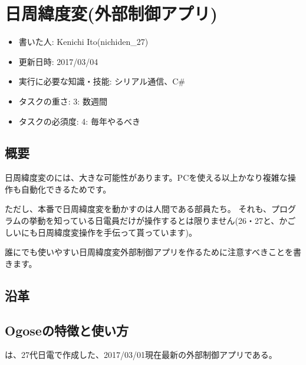\documentclass[letterpaper,10pt,dvipdfmx]{sphinxmanual}
\begin{document}
\chapter{日周緯度変(外部制御アプリ)}
\label{\detokenize{nissyu-idohen/pc-software:}}\label{\detokenize{nissyu-idohen/pc-software::doc}}\label{\detokenize{nissyu-idohen/pc-software:id1}}\begin{itemize}
\item {} 
書いた人: Kenichi Ito(nichiden\_27)

\item {} 
更新日時: 2017/03/04

\item {} 
実行に必要な知識・技能: シリアル通信、C\#

\item {} 
タスクの重さ: 3: 数週間

\item {} 
タスクの必須度: 4: 毎年やるべき

\end{itemize}


\section{概要}
\label{\detokenize{nissyu-idohen/pc-software:}}\label{\detokenize{nissyu-idohen/pc-software:id2}}
日周緯度変の{\hyperref[\detokenize{nissyu-idohen/ikebukuro::doc}]{}}には、大きな可能性があります。PCを使える以上かなり複雑な操作も自動化できるためです。

ただし、本番で日周緯度変を動かすのは人間である部員たち。
それも、プログラムの挙動を知っている日電員だけが操作するとは限りません(26・27と、かごしいにも日周緯度変操作を手伝って貰っています)。

誰にでも使いやすい日周緯度変外部制御アプリを作るために注意すべきことを書きます。


\section{沿革}
\label{\detokenize{nissyu-idohen/pc-software:}}\label{\detokenize{nissyu-idohen/pc-software:id3}}


\section{Ogoseの特徴と使い方}
\label{\detokenize{nissyu-idohen/pc-software:ogose}}
は、27代日電で作成した、2017/03/01現在最新の外部制御アプリである。
\end{document}
